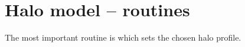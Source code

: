 \section{Halo model -- routines}

The most important routine is  which sets the chosen halo
profile.

